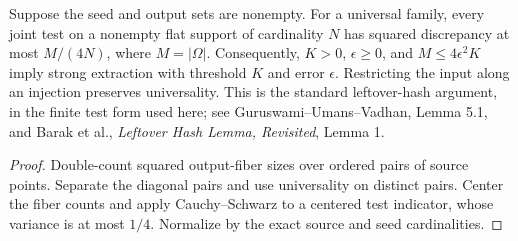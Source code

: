 \begin{theorem}
  \label{thm:lowerbounds-algebraic-leftover-hashing}
  \leanok
  Suppose the seed and output sets are nonempty. For a universal family,
  every joint test on a nonempty flat support of cardinality $N$ has
  squared discrepancy at most $M/(4N)$, where $M=|\Omega|$. Consequently,
  $K>0$, $\epsilon\ge0$, and $M\le4\epsilon^2K$ imply strong extraction
  with threshold $K$ and error $\epsilon$. Restricting the input along an
  injection preserves universality. This is the standard leftover-hash
  argument, in the finite test form used here; see Guruswami--Umans--Vadhan,
  Lemma 5.1, and Barak et al., \emph{Leftover Hash Lemma, Revisited}, Lemma 1.
\end{theorem}
\begin{proof}
  \leanok
  Double-count squared output-fiber sizes over ordered pairs of source
  points. Separate the diagonal pairs and use universality on distinct
  pairs. Center the fiber counts and apply Cauchy--Schwarz to a centered
  test indicator, whose variance is at most $1/4$. Normalize by the exact
  source and seed cardinalities.
\end{proof}

